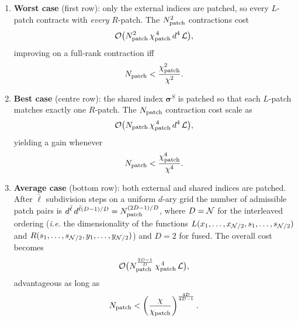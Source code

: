 \begingroup
\renewcommand{\labelenumi}{(\alph{enumi})}
\begin{enumerate}
\item \textbf{Worst case} (first row):  
      only the external indices are patched, so every \(L\)-patch contracts
      with \emph{every} \(R\)-patch.  
      The \(N_{\text{patch}}^{2}\) contractions cost
      \begin{equation}
        \label{eq:worsScaling}
        \mathcal{O}\bigl(
           N_{\text{patch}}^{2}\,
           \chi_{\text{patch}}^{\,4}\,d^{4}\,\mathcal L
        \bigr),
      \end{equation}
      improving on a full-rank contraction iff
      \begin{equation}
       N_{\text{patch}}<\frac{\chi_{\text{patch}}^{2}}{\chi^{2}}.
       \label{eq:worstBound}
      \end{equation}
      

\item \textbf{Best case} (centre row):  
      the shared index \(\boldsymbol{\sigma}^{S}\) is patched so that each
      \(L\)-patch matches exactly one \(R\)-patch.  
      The \(N_{\text{patch}} \) contraction cost scale as
      \begin{equation}
        \mathcal{O}\bigl(
          N_{\text{patch}} \,
          \chi_{\text{patch}}^{\,4}\,d^{4}\,\mathcal L
        \bigr),
      \end{equation}
      yielding a gain whenever
      \begin{equation}
       N_{\text{patch}}<\frac{\chi_{\text{patch}}^{4}}{\chi^{4}}.
       \label{eq:bestBound}
      \end{equation}

\item \textbf{Average case} (bottom row):  
      both external and shared indices are patched.  
      After \(\bar\ell\) subdivision steps on a uniform \(d\)-ary grid the
      number of admissible patch pairs is
      \(d^{\bar\ell}\,d^{\bar\ell( D-1)/D}
       =N_{\text{patch}}^{(2D-1)/D}\), where $D=\mathcal{N}$ for the interleaved ordering (\textit{i.e.} the dimensionality of the functions $L(x_1,\dots,x_{\mathcal{N}/2},s_1,\dots,s_{\mathcal{N}/2})$ and $R(s_1,\dots,s_{\mathcal{N}/2},y_1,\dots,y_{\mathcal{N}/2})$) and \(D=2\) for fused.
      The overall cost becomes
      \begin{equation}
        \mathcal{O}\bigl(
          N_{\text{patch}}^{\frac{2D-1}{D}}\,
          \chi_{\text{patch}}^{\,4}\,\mathcal L
        \bigr),
      \end{equation}
      advantageous as long as
      \begin{equation}
        N_{\text{patch}}<\left(\frac{\chi}{\chi_{\text{patch}}}\right)^{\frac{4D}{2D-1}}.
        \label{eq:averageBound}
      \end{equation}
\end{enumerate}
\endgroup

